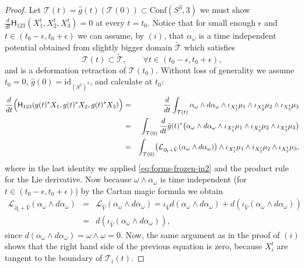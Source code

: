 \documentclass[12pt]{article}
\newcommand{\Cnf}{\text{Conf}}
\newcommand{\no}{\noindent}
\begin{document}
\begin{proof}
\no Let $\mathcal{T}(t)=\hat{g}(t)(\mathcal{T}(0))\subset \Cnf(S^3,3)$ we must show $\frac{d}{dt} 
\mathsf{H}_{123}(X^t_1,X^t_2,X^t_3)=0$  at every $t=t_0$. Notice that 
for small enough $\epsilon$ and $t\in (t_0-\epsilon,t_0+\epsilon)$ we can assume, by $(i)$, that $\alpha_\omega$ is a time independent potential obtained from slightly bigger domain $\widetilde{\mathcal{T}}$ which satisfies 
\[
  \mathcal{T}(t)\subset\widetilde{\mathcal{T}},\qquad \forall t\in (t_0-\epsilon,t_0+\epsilon),
\]
and is a deformation retraction of $\mathcal{T}(t_0)$. Without loss of generality we assume 
$t_0=0$, $\hat{g}(0)=\text{id}_{(S^3)^3}$, and calculate at $t_0$:
\begin{eqnarray*}
 \frac{d}{dt} 
 \Bigl(\mathsf{H}_{123}(g(t)^\ast X_1,g(t)^\ast X_2,g(t)^\ast X_3)\Bigr) & = &
 \frac{d}{dt} \int_{\mathcal{T}(t)} \alpha_\omega\wedge d\alpha_\omega\wedge \iota_{X^t_1}\mu_1\wedge \iota_{X^t_2}\mu_2\wedge \iota_{X^t_3}\mu_3\\
 & = & \int_{\mathcal{T}(0)} \frac{d}{dt} \hat{g}(t)^\ast\bigl(\alpha_\omega\wedge d\alpha_\omega\wedge \iota_{X^t_1}\mu_1\wedge \iota_{X^t_2}\mu_2\wedge \iota_{X^t_3}\mu_3\bigr)\\
 & = & \int_{\mathcal{T}(0)} \bigl(\mathcal{L}_{\partial_t+\hat{V}}(\alpha_\omega\wedge d\alpha_\omega)\bigr)\wedge \iota_{X^t_1}\mu_1\wedge \iota_{X^t_2}\mu_2\wedge \iota_{X^t_3}\mu_3,
\end{eqnarray*}
where in the last identity we applied \eqref{eq:forms-frozen-in2} and the product rule for the Lie derivative.
Now because $\omega\wedge\alpha_\omega$ is time independent (for $t\in (t_0-\epsilon,t_0+\epsilon)$) by the Cartan magic formula we obtain
\begin{eqnarray*}
 \mathcal{L}_{\partial_t+\hat{V}}(\alpha_\omega\wedge d\alpha_\omega) & = & \mathcal{L}_{\hat{V}}(\alpha_\omega\wedge d\alpha_\omega) = \iota_{\hat{V}} d(\alpha_\omega\wedge d\alpha_\omega)+ d(\iota_{\hat{V}} (\alpha_\omega\wedge d\alpha_\omega))\\
 & =  & d(\iota_{\hat{V}} (\alpha_\omega\wedge d\alpha_\omega)),
\end{eqnarray*}
since $d(\alpha_\omega\wedge d\alpha_\omega)=\omega\wedge\omega=0$. %
 Now, the same argument as in the proof of $(i)$ shows that the right hand side of the previous equation is zero, because $X^t_i$ are tangent to the boundary of $\mathcal{T}_i(t)$.
\end{proof}
\end{document}
